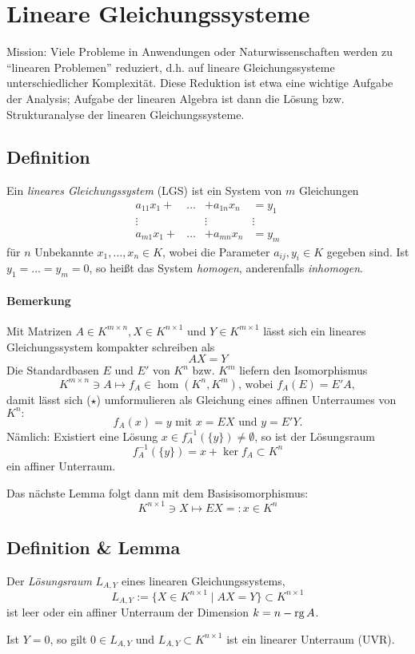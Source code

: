 \section{Lineare Gleichungssysteme}
	Mission: Viele Probleme in Anwendungen oder Naturwissenschaften werden zu "`linearen Problemen"' reduziert, d.h. auf lineare Gleichungssysteme unterschiedlicher Komplexität.
	Diese Reduktion ist etwa eine wichtige Aufgabe der Analysis; Aufgabe der linearen Algebra ist dann die Lösung bzw. Strukturanalyse der linearen Gleichungssysteme.
\subsection{Definition}
	\begin{Definition}
	Ein \emph{lineares Gleichungssystem} (LGS) ist ein System von $ m $ Gleichungen
		\[ \begin{array}{cccc}\tag{$\star\star$}
		a_{11}x_1+&\dots &+ a_{1n}x_n &=y_1\\
		\vdots & &\vdots & \vdots\\
		a_{m1}x_1 +& \dots &+a_{mn}x_n &= y_m
		\end{array} \]
	für $ n $ Unbekannte $ x_1,\dots,x_n\in K $, wobei die Parameter $ a_{ij},y_i\in K $ gegeben sind. Ist $ y_1 = \dots = y_m = 0 $, so heißt das System \emph{homogen}, anderenfalls \emph{inhomogen}.
	\end{Definition}
\paragraph{Bemerkung}
	Mit Matrizen $ A\in K^{m\times n},X\in K^{n\times 1} $ und $ Y\in K^{m\times 1} $ lässt sich ein lineares Gleichungssystem kompakter schreiben als
		\[ AX = Y \tag{$\star$}\]
	Die Standardbasen $ E $ und $ E' $ von $ K^n $ bzw. $ K^m $ liefern den Isomorphismus
		\[ K^{m\times n}\ni A\mapsto f_A\in \hom(K^n,K^m)\text{, wobei }f_A(E) = E'A, \]
	damit lässt sich ($\star$) umformulieren als Gleichung eines affinen Unterraumes von $ K^n: $
		\[ f_A(x) = y \text{ mit } x=EX \text{ und } y=E'Y. \]
	Nämlich: Existiert eine Lösung $ x\in f_A^{-1}(\{y\})\neq \emptyset $, so ist der Lösungsraum
		\[ f_A^{-1}(\{y\}) = x+\ker f_A\subset K^n \]
	ein affiner Unterraum.
	
	Das nächste Lemma folgt dann mit dem Basisisomorphismus:
		\[ K^{n\times 1} \ni X \mapsto EX =: x\in K^n \]
\subsection{Definition \& Lemma}
	\begin{Lemma}[Lösungsraum]
	Der \emph{Lösungsraum} $ L_{A,Y} $ eines linearen Gleichungssystems,
		\[ L_{A,Y}:=\{X\in K^{n\times 1}\mid AX=Y\}\subset K^{n\times 1} \]
	ist leer oder ein affiner Unterraum der Dimension $ k = n-\operatorname{rg} A $.
	
	Ist $ Y = 0 $, so gilt $ 0\in L_{A,Y} $ und $ L_{A,Y}\subset K^{n\times 1} $ ist ein linearer Unterraum (UVR).
	\end{Lemma}

